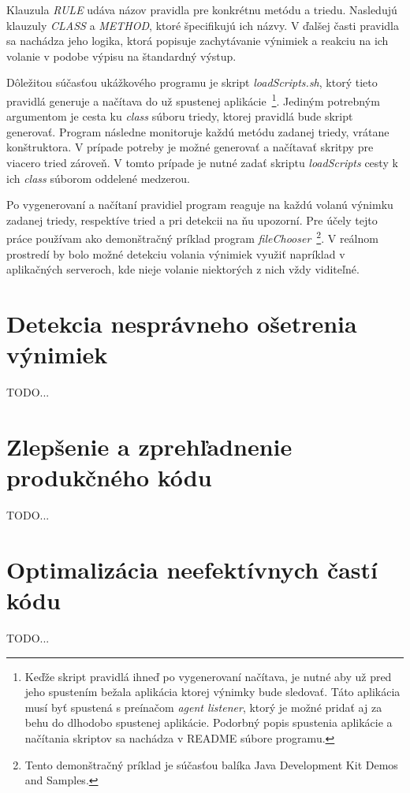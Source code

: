 \documentclass[11pt,final,oneside]{fithesis}
\begin{document}
Klauzula \textit{RULE} udáva názov pravidla pre konkrétnu metódu a triedu. Nasledujú klauzuly \textit{CLASS} a \textit{METHOD}, ktoré špecifikujú ich názvy. V ďalšej časti pravidla sa nachádza jeho logika, ktorá popisuje zachytávanie výnimiek a reakciu na ich volanie v podobe výpisu na štandardný výstup.

Dôležitou súčasťou ukážkového programu je skript \textit{loadScripts.sh}, ktorý tieto pravidlá generuje a načítava do už spustenej aplikácie~\footnote{Keďže skript pravidlá ihneď po vygenerovaní načítava, je nutné aby už pred jeho spustením bežala aplikácia ktorej výnimky bude sledovať. Táto aplikácia musí byť spustená s preínačom \textit{agent listener}, ktorý je možné pridať aj za behu do dlhodobo spustenej aplikácie. Podorbný popis spustenia aplikácie a načítania skriptov sa nachádza v README súbore programu.}. Jediným potrebným argumentom je cesta ku \textit{class} súboru triedy, ktorej pravidlá bude skript generovať. Program následne monitoruje každú metódu zadanej triedy, vrátane konštruktora. V prípade potreby je možné generovať a načítavať skritpy pre viacero tried zároveň. V tomto prípade je nutné zadať skriptu \textit{loadScripts} cesty k ich \textit{class} súborom oddelené medzerou.

Po vygenerovaní a načítaní pravidiel program reaguje na každú volanú výnimku zadanej triedy, respektíve tried a pri detekcii na ňu upozorní. Pre účely tejto práce používam ako demonštračný príklad program \textit{fileChooser}~\footnote{Tento demonštračný príklad je súčasťou balíka Java Development Kit Demos and Samples.}. V reálnom prostredí by bolo možné detekciu volania výnimiek využiť napríklad v aplikačných serveroch, kde nieje volanie niektorých z nich vždy viditeľné.

\section{Detekcia nesprávneho ošetrenia výnimiek}
TODO...

\section{Zlepšenie a zprehľadnenie produkčného kódu}
TODO...

\section{Optimalizácia neefektívnych častí kódu}
TODO...
\end{document}
